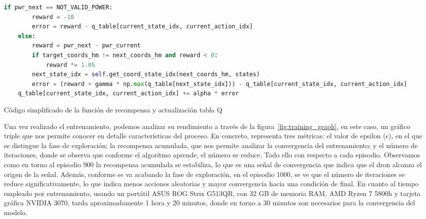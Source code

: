 \begin{code}[tp]
    \begin{lstlisting}[language=Python]
    if pwr_next == NOT_VALID_POWER:
        reward = -10
        error = reward - q_table[current_state_idx, current_action_idx]
    else:
        reward = pwr_next - pwr_current
        if target_coords_hm != next_coords_hm and reward < 0:
            reward *= 1.05
        next_state_idx = self.get_coord_state_idx(next_coords_hm, states)
        error = (reward + gamma * np.max(q_table[next_state_idx])) - q_table[current_state_idx, current_action_idx]
    q_table[current_state_idx, current_action_idx] += alpha * error
    \end{lstlisting}
    \caption[Código simplificado de la función de recompensa y actualización tabla Q]{Código simplificado de la función de recompensa y actualización tabla Q}
    \label{cod:reward_python}
\end{code}

Una vez realizado el entrenamiento, podemos analizar su rendimiento a través de la figura~\ref{fig:training_graph}, en este caso, un gráfico triple que nos permite conocer en detalle características del proceso. En concreto, representa tres métricas: el valor de epsilon ($\epsilon$), en el que se distingue la fase de exploración; la recompensa acumulada, que nos permite analizar la convergencia del entrenamiento; y el número de iteraciones, donde se observa que conforme el algoritmo aprende, el número se reduce. Todo ello con respecto a cada episodio. Observamos como en torno al episodio 900 la recompensa acumulada se estabiliza, lo que es una señal de convergencia que indica que el dron alcanza el origen de la señal. Además, conforme se va acabando la fase de exploración, en el episodio 1000, se ve que el número de iteraciones se reduce significativamente, lo que indica menos acciones aleatorias y mayor convergencia hacia una condición de final. En cuanto al tiempo empleado por entrenamiento, usando un portátil ASUS ROG Strix G513QR, con 32 GB de memoria RAM, AMD Ryzen 7 5800h y tarjeta gráfica NVIDIA 3070, tarda aproximadamente 1 hora y 20 minutos, donde en torno a 30 minutos son necesarios para la convergencia del modelo.\\

